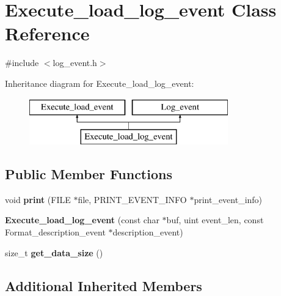 \hypertarget{classExecute__load__log__event}{}\section{Execute\+\_\+load\+\_\+log\+\_\+event Class Reference}
\label{classExecute__load__log__event}


{\ttfamily \#include $<$log\+\_\+event.\+h$>$}

Inheritance diagram for Execute\+\_\+load\+\_\+log\+\_\+event\+:\begin{figure}[H]
\begin{center}
\leavevmode
\includegraphics[height=2.000000cm]{classExecute__load__log__event}
\end{center}
\end{figure}
\subsection*{Public Member Functions}
\begin{DoxyCompactItemize}
\item 
\mbox{\label{classExecute__load__log__event_a23350cdd6d9a54dfef80c261bd0fe804}} 
void {\bfseries print} (F\+I\+LE $\ast$file, P\+R\+I\+N\+T\+\_\+\+E\+V\+E\+N\+T\+\_\+\+I\+N\+FO $\ast$print\+\_\+event\+\_\+info)
\item 
\mbox{\label{classExecute__load__log__event_a7f43367756815bde30932c4f0e8540b1}} 
{\bfseries Execute\+\_\+load\+\_\+log\+\_\+event} (const char $\ast$buf, uint event\+\_\+len, const Format\+\_\+description\+\_\+event $\ast$description\+\_\+event)
\item 
\mbox{\label{classExecute__load__log__event_a19600ec17f1d34f77876f79de2778817}} 
size\+\_\+t {\bfseries get\+\_\+data\+\_\+size} ()
\end{DoxyCompactItemize}
\subsection*{Additional Inherited Members}


